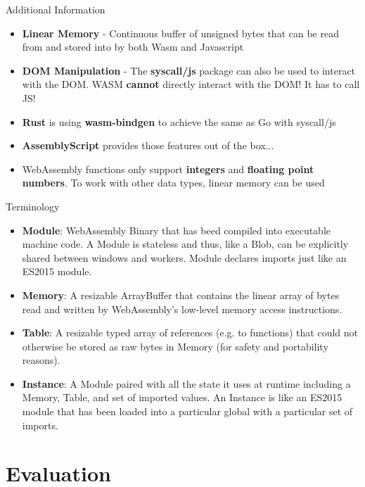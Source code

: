\documentclass{beamer}
\begin{document}
\begin{frame}{Additional Information}
    \begin{itemize}
        \item \textbf{Linear Memory} - Continuous buffer of unsigned bytes that can be read from and stored into by both Wasm and Javascript
        \item \textbf{DOM Manipulation} - The \textbf{syscall/js} package can also be used to interact with the DOM. WASM \textbf{cannot} directly interact with the DOM! It has to call JS!
        \item \textbf{Rust} is using \textbf{wasm-bindgen} to achieve the same as Go with syscall/js
        \item \textbf{AssemblyScript} provides those features out of the box...
        \item WebAssembly functions only support \textbf{integers} and \textbf{floating point numbers}. To work with other data types, linear memory can be used
    \end{itemize}
\end{frame}

\begin{frame}{Terminology}
    \begin{itemize}
        \item \textbf{Module}: WebAssembly Binary that has beed compiled into executable machine code. A Module is stateless and thus, like a Blob, can be explicitly shared between windows and workers. Module declares imports just like an ES2015 module.
        \item \textbf{Memory}: A resizable ArrayBuffer that contains the linear array of bytes read and written by WebAssembly’s low-level memory access instructions.
        \item \textbf{Table}: A resizable typed array of references (e.g. to functions) that could not otherwise be stored as raw bytes in Memory (for safety and portability reasons).
        \item \textbf{Instance}: A Module paired with all the state it uses at runtime including a Memory, Table, and set of imported values. An Instance is like an ES2015 module that has been loaded into a particular global with a particular set of imports.
    \end{itemize}
\end{frame}

\section{Evaluation}
\end{document}

